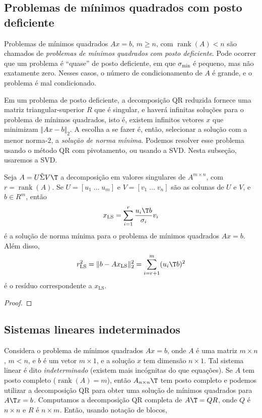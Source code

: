 \documentclass{article}
\DeclareMathOperator{\rank}{rank}
\begin{document}
\subsection{Problemas de mínimos quadrados com posto deficiente}

Problemas de mínimos quadrados \(Ax=b\), \(m \geq n\), com \(\rank(A) < n\) são chamados de \emph{problemas de mínimos quadrados com posto deficiente}. Pode ocorrer que um problema é ``quase'' de posto deficiente, em que \(\sigma_{\min}\) é pequeno, mas não exatamente zero. Nesses casos, o número de condicionamento de \(A\) é grande, e o problema é mal condicionado.

Em um problema de posto deficiente, a decomposição QR reduzida fornece uma matriz triangular-superior \(R\) que é singular, e haverá infinitas soluções para o problema de mínimos quadrados, isto é, existem infinitos vetores \(x\) que minimizam \(\Vert Ax - b \Vert_2\). A escolha a se fazer é, então, selecionar a solução com a menor norma-\(2\), a \emph{solução de norma mínima}. Podemos resolver esse problema usando o método QR com pivotamento, ou usando a SVD. Nesta subseção, usaremos a SVD.

\begin{thm}
    Seja \(A = U \tilde{\Sigma} V\T \) a decomposição em valores singulares de \(A^{m \times n}\), com \(r = \rank(A)\). Se \(U = [u_1 \; \ldots \; u_m]\) e \(V = [v_1 \; \ldots \; v_n]\) são as colunas de \(U\) e \(V\), e \(b \in R^m\), então
    \begin{equation}
        x_{\text{LS}} = \sum_{i=1}^{r} \frac{u_i\T  b}{\sigma_i} v_i
    \end{equation} é a solução de norma mínima para o problema de mínimos quadrados \(Ax=b\). Além disso,
    \begin{equation}
        r_{\text{LS}}^2 = \Vert b - Ax_{\text{LS}} \Vert_2^2 = \sum_{i=r+1}^{m} (u_i\T  b)^2
    \end{equation} é o resíduo correspondente a \(x_{\text{LS}}\).
\end{thm}

\begin{proof}
    
\end{proof}

\subsection{Sistemas lineares indeterminados}

Considera o problema de mínimos quadrados \(Ax=b\), onde \(A\) é uma matriz \(m \times n\), \(m<n\), e \(b\) é um vetor \(m\times 1\), e a solução \(x\) tem dimensão \(n \times 1\). Tal sistema linear é dito \emph{indeterminado} (existem mais incógnitas do que equações). Se \(A\) tem posto completo (\(\rank(A) = m\)), então \(A_{n \times n}\T \) tem posto completo e podemos utilizar a decomposição QR para obter uma solução de mínimos quadrados para \(A\T x = b\). Computamos a decomposição QR completa de \(A\T  = QR\), onde \(Q\) é \(n \times n\) e \(R\) é \(n \times m\). Então, usando notação de blocos,
    
\end{document}
